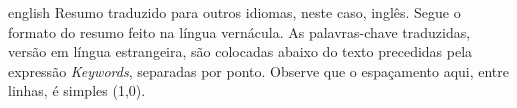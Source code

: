 \documentclass[
12pt,				%
oneside,			%
a4paper,			%
chapter=TITLE,		%
section=TITLE,		%
english,			%
brazil				%
hyperref=hidelinks]{abntex2}
\begin{document}
\begin{resumo}[Abstract]
    \begin{otherlanguage*}{english}
        Resumo traduzido para outros idiomas, neste caso, inglês. Segue o formato do resumo feito na língua vernácula. As palavras-chave traduzidas, versão em língua estrangeira, são colocadas abaixo do texto precedidas pela expressão \emph{Keywords}, separadas por ponto. Observe que o espaçamento aqui, entre linhas, é simples (1,0).
    \end{otherlanguage*}

\end{resumo}
\imprimirlistafiguras

\imprimirlistaquadros

\imprimirlistatabelas



\imprimirsumario


\textual





\postextual
%
%
\end{document}

